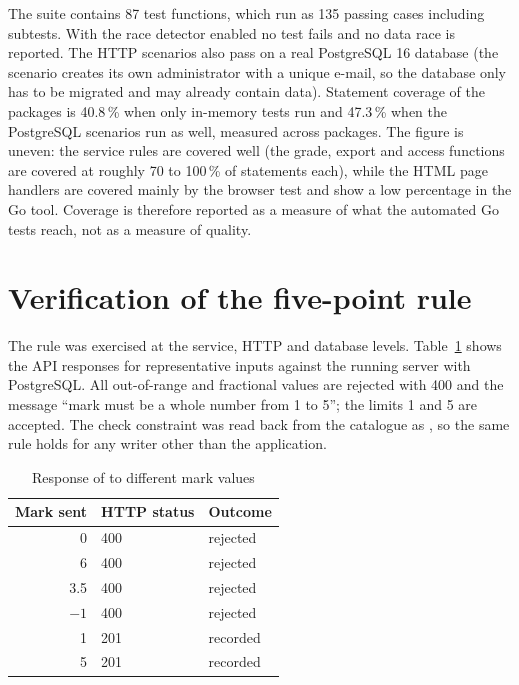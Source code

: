 The suite contains 87 test functions, which run as 135 passing cases including subtests. With the race detector enabled no test fails and no data race is reported. The HTTP scenarios also pass on a real PostgreSQL 16 database (the scenario creates its own administrator with a unique e-mail, so the database only has to be migrated and may already contain data). Statement coverage of the  packages is 40.8\,\% when only in-memory tests run and 47.3\,\% when the PostgreSQL scenarios run as well, measured across packages. The figure is uneven: the service rules are covered well (the grade, export and access functions are covered at roughly 70 to 100\,\% of statements each), while the HTML page handlers are covered mainly by the browser test and show a low percentage in the Go tool. Coverage is therefore reported as a measure of what the automated Go tests reach, not as a measure of quality.

\section{Verification of the five-point rule}

The rule was exercised at the service, HTTP and database levels. Table~\ref{tab:fivepoint} shows the API responses for representative inputs against the running server with PostgreSQL. All out-of-range and fractional values are rejected with 400 and the message ``mark must be a whole number from 1 to 5''; the limits 1 and 5 are accepted. The check constraint was read back from the catalogue as , so the same rule holds for any writer other than the application.

\begin{table}[H]
\centering
\caption{Response of  to different mark values}
\label{tab:fivepoint}
\begin{tabular}{@{}rll@{}}
\toprule
Mark sent & HTTP status & Outcome \\
\midrule
0 & 400 & rejected \\
6 & 400 & rejected \\
3.5 & 400 & rejected \\
$-1$ & 400 & rejected \\
1 & 201 & recorded \\
5 & 201 & recorded \\
\bottomrule
\end{tabular}
\end{table}

